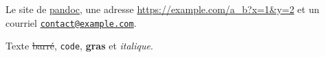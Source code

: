 Le site de \href{https://pandoc.org}{pandoc}, une adresse \url{https://example.com/a_b?x=1&y=2}
et un courriel \href{mailto:contact@example.com}{\nolinkurl{contact@example.com}}.

Texte \st{barré}, \texttt{code}, \textbf{gras} et \emph{italique}.

\begin{Shaded}
\begin{Highlighting}[]
\NormalTok{) }\OperatorTok{{-}\textgreater{}} \NormalTok{:}
     \SpecialCharTok{\{}\SpecialCharTok{\}}
\end{Highlighting}
\end{Shaded}
